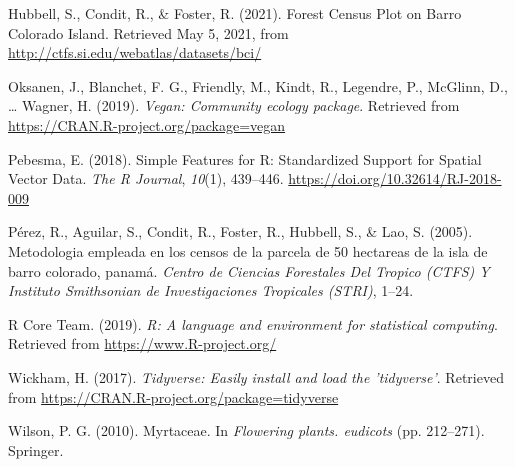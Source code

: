\documentclass[11pt,]{article}
\begin{document}
\hypertarget{ref-webcenso}{}
Hubbell, S., Condit, R., \& Foster, R. (2021). Forest Census Plot on
Barro Colorado Island. Retrieved May 5, 2021, from
\url{http://ctfs.si.edu/webatlas/datasets/bci/}

\hypertarget{ref-vegan}{}
Oksanen, J., Blanchet, F. G., Friendly, M., Kindt, R., Legendre, P.,
McGlinn, D., \ldots{} Wagner, H. (2019). \emph{Vegan: Community ecology
package}. Retrieved from \url{https://CRAN.R-project.org/package=vegan}

\hypertarget{ref-sf}{}
Pebesma, E. (2018). Simple Features for R: Standardized Support for
Spatial Vector Data. \emph{The R Journal}, \emph{10}(1), 439--446.
\url{https://doi.org/10.32614/RJ-2018-009}

\hypertarget{ref-perez2005metodologia}{}
Pérez, R., Aguilar, S., Condit, R., Foster, R., Hubbell, S., \& Lao, S.
(2005). Metodologia empleada en los censos de la parcela de 50 hectareas
de la isla de barro colorado, panamá. \emph{Centro de Ciencias
Forestales Del Tropico (CTFS) Y Instituto Smithsonian de Investigaciones
Tropicales (STRI)}, 1--24.

\hypertarget{ref-citadeR}{}
R Core Team. (2019). \emph{R: A language and environment for statistical
computing}. Retrieved from \url{https://www.R-project.org/}

\hypertarget{ref-tidyverse}{}
Wickham, H. (2017). \emph{Tidyverse: Easily install and load the
'tidyverse'}. Retrieved from
\url{https://CRAN.R-project.org/package=tidyverse}

\hypertarget{ref-wilson2010myrtaceae}{}
Wilson, P. G. (2010). Myrtaceae. In \emph{Flowering plants. eudicots}
(pp. 212--271). Springer.




\newpage
\singlespacing 
\end{document}
